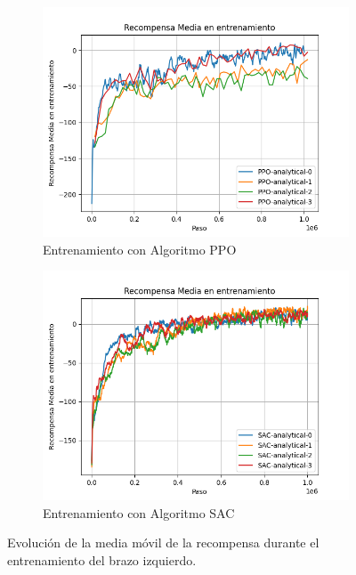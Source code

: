 \begin{figure}[h!]
	\centering
	
	\begin{subfigure}[b]{0.48\textwidth}
		\centering
		\includegraphics[width=\textwidth]{images/graphs/PPO/Left/ep_rew_mean}
		\caption{Entrenamiento con Algoritmo PPO}
		\label{fig:train-ppo-rew-left}
	\end{subfigure}
	\hfill
	\begin{subfigure}[b]{0.48\textwidth}
		\centering
		\includegraphics[width=\textwidth]{images/graphs/SAC/Left/ep_rew_mean}
		\caption{Entrenamiento con Algoritmo SAC}
		\label{fig:train-sac-rew-left}
	\end{subfigure}
	
	\caption{Evolución de la media móvil de la recompensa durante el entrenamiento del brazo izquierdo.}
	\label{fig:train-rew-left}
\end{figure}


